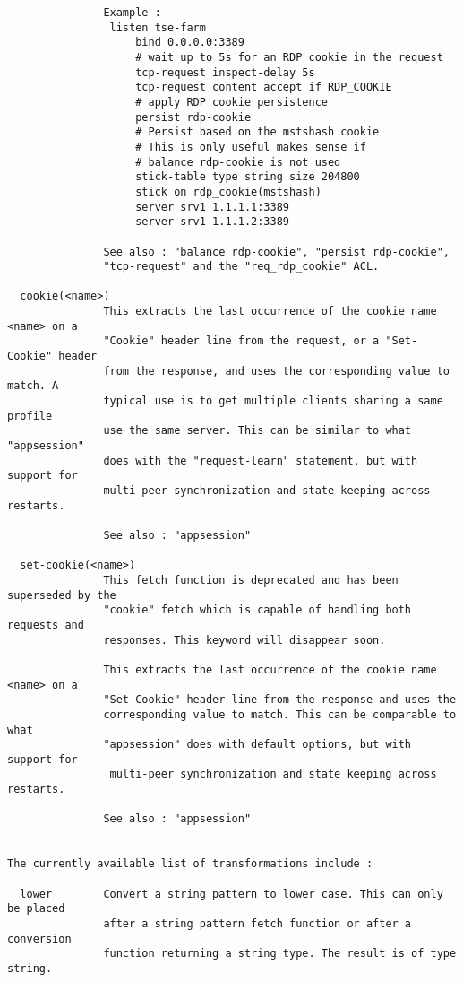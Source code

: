\begin{verbatim}
               Example :
                listen tse-farm
                    bind 0.0.0.0:3389
                    # wait up to 5s for an RDP cookie in the request
                    tcp-request inspect-delay 5s
                    tcp-request content accept if RDP_COOKIE
                    # apply RDP cookie persistence
                    persist rdp-cookie
                    # Persist based on the mstshash cookie
                    # This is only useful makes sense if
                    # balance rdp-cookie is not used
                    stick-table type string size 204800
                    stick on rdp_cookie(mstshash)
                    server srv1 1.1.1.1:3389
                    server srv1 1.1.1.2:3389

               See also : "balance rdp-cookie", "persist rdp-cookie",
               "tcp-request" and the "req_rdp_cookie" ACL.

  cookie(<name>)
               This extracts the last occurrence of the cookie name <name> on a
               "Cookie" header line from the request, or a "Set-Cookie" header
               from the response, and uses the corresponding value to match. A
               typical use is to get multiple clients sharing a same profile
               use the same server. This can be similar to what "appsession"
               does with the "request-learn" statement, but with support for
               multi-peer synchronization and state keeping across restarts.

               See also : "appsession"

  set-cookie(<name>)
               This fetch function is deprecated and has been superseded by the
               "cookie" fetch which is capable of handling both requests and
               responses. This keyword will disappear soon.

               This extracts the last occurrence of the cookie name <name> on a
               "Set-Cookie" header line from the response and uses the
               corresponding value to match. This can be comparable to what
               "appsession" does with default options, but with support for
                multi-peer synchronization and state keeping across restarts.

               See also : "appsession"


The currently available list of transformations include :

  lower        Convert a string pattern to lower case. This can only be placed
               after a string pattern fetch function or after a conversion
               function returning a string type. The result is of type string.


\end{verbatim}
